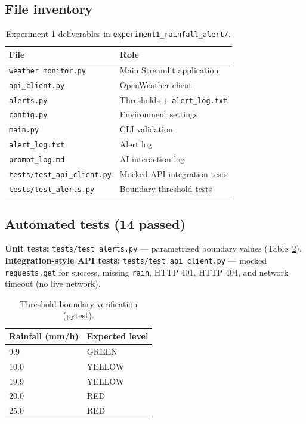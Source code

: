 \documentclass[11pt,a4paper]{article}
\begin{document}
\subsection{File inventory}
\begin{table}[htbp]
  \centering
  \caption{Experiment 1 deliverables in \texttt{experiment1\_rainfall\_alert/}.}
  \label{tab:files}
  \small
  \begin{tabular}{@{}ll@{}}
    \toprule
    File & Role \\
    \midrule
    \texttt{weather\_monitor.py} & Main Streamlit application \\
    \texttt{api\_client.py} & OpenWeather client \\
    \texttt{alerts.py} & Thresholds + \texttt{alert\_log.txt} \\
    \texttt{config.py} & Environment settings \\
    \texttt{main.py} & CLI validation \\
    \texttt{alert\_log.txt} & Alert log \\
    \texttt{prompt\_log.md} & AI interaction log \\
    \texttt{tests/test\_api\_client.py} & Mocked API integration tests \\
    \texttt{tests/test\_alerts.py} & Boundary threshold tests \\
    \bottomrule
  \end{tabular}
\end{table}

\subsection{Automated tests (14 passed)}
\textbf{Unit tests:} \texttt{tests/test\_alerts.py} --- parametrized boundary values (Table~\ref{tab:boundaries}). \textbf{Integration-style API tests:} \texttt{tests/test\_api\_client.py} --- mocked \texttt{requests.get} for success, missing \texttt{rain}, HTTP 401, HTTP 404, and network timeout (no live network).

\begin{table}[htbp]
  \centering
  \caption{Threshold boundary verification (pytest).}
  \label{tab:boundaries}
  \begin{tabular}{@{}ll@{}}
    \toprule
    Rainfall (mm/h) & Expected level \\
    \midrule
    9.9 & GREEN \\
    10.0 & YELLOW \\
    19.9 & YELLOW \\
    20.0 & RED \\
    25.0 & RED \\
    \bottomrule
  \end{tabular}
\end{table}
\end{document}
